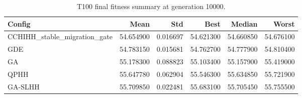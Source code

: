 \begin{table}[htbp]
\centering
\caption{T100 final fitness summary at generation 10000.}
\label{tab:t100_final_fitness_summary}
\begin{tabular}{lrrrrr}
\toprule
Config & Mean & Std & Best & Median & Worst \\
\midrule
CCHIHH\_stable\_migration\_gate & 54.654900 & 0.016697 & 54.621300 & 54.660850 & 54.676100 \\
GDE & 54.783150 & 0.015681 & 54.762700 & 54.777900 & 54.810400 \\
GA & 55.178300 & 0.088823 & 55.103400 & 55.157900 & 55.419000 \\
QPHH & 55.647780 & 0.062904 & 55.546300 & 55.634850 & 55.721900 \\
GA-SLHH & 55.709850 & 0.022481 & 55.683100 & 55.705450 & 55.755500 \\
\bottomrule
\end{tabular}
\end{table}
